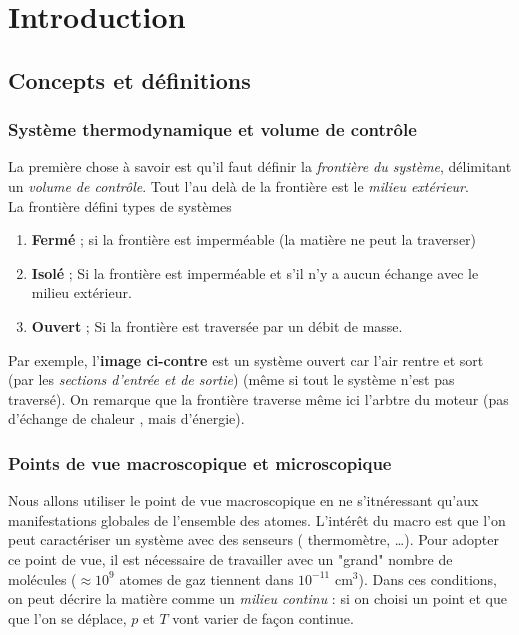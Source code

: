\chapter{Introduction} 

	\setcounter{section}{1}
\section{Concepts et définitions}
	\subsection{Système thermodynamique et volume de contrôle}
	La première chose à savoir est qu'il faut définir la \textit{frontière 
	du système}, délimitant un \textit{volume de contrôle}. Tout l'au delà 
	de la frontière est le \textit{milieu extérieur}.\\
	
	La frontière défini  types de systèmes
	\begin{enumerate}
	\item \textbf{Fermé} ; si la frontière est imperméable (la matière ne 
	peut la traverser)
	\item \textbf{Isolé} ; Si la frontière est imperméable et s'il n'y a 
	aucun échange avec le milieu extérieur.
	\item \textbf{Ouvert} ; Si la frontière est traversée par un débit de 
	masse.
	\end{enumerate}

	Par exemple, l'\textbf{image ci-contre} est un système ouvert car l'air 
	rentre et sort (par les \textit{sections d'entrée et de sortie}) (même 
	si tout le système n'est pas traversé). On remarque que la frontière 
	traverse même ici l'arbtre du moteur (pas d'échange de chaleur , mais 
	d'énergie).
	
	
	\subsection{Points de vue macroscopique et microscopique}
	Nous allons utiliser le point de vue macroscopique en ne s'itnéressant  
	qu'aux manifestations globales de l'ensemble des atomes. L'intérêt du 
	macro est que l'on peut caractériser un système avec des senseurs (
	thermomètre, \dots). Pour adopter ce point de vue, il est nécessaire 
	de travailler avec un "grand" nombre de molécules ($\approx 10^9$ atomes 
	de gaz tiennent dans $10^{-11}$ cm$^3$). Dans ces conditions, on peut 
	décrire la matière comme un \textit{milieu continu} : si on choisi un 
	point et que que l'on se déplace, $p$ et $T$ vont varier de façon 
	continue.
	
